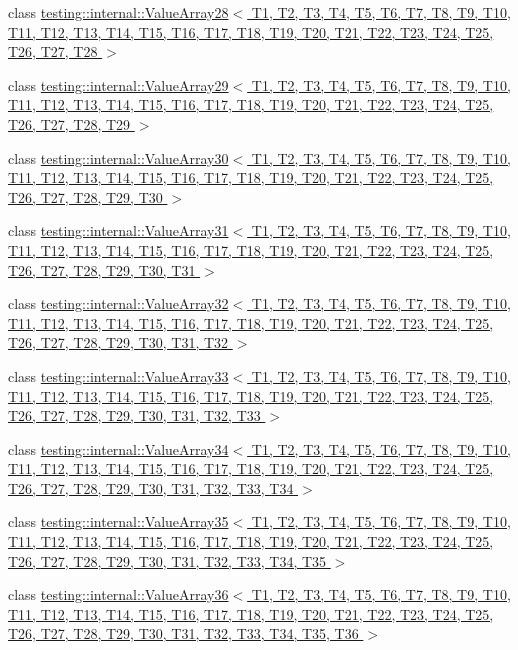 \begin{DoxyCompactItemize}
class \hyperlink{classtesting_1_1internal_1_1_value_array28}{testing\-::internal\-::\-Value\-Array28$<$ T1, T2, T3, T4, T5, T6, T7, T8, T9, T10, T11, T12, T13, T14, T15, T16, T17, T18, T19, T20, T21, T22, T23, T24, T25, T26, T27, T28 $>$}
\item 
class \hyperlink{classtesting_1_1internal_1_1_value_array29}{testing\-::internal\-::\-Value\-Array29$<$ T1, T2, T3, T4, T5, T6, T7, T8, T9, T10, T11, T12, T13, T14, T15, T16, T17, T18, T19, T20, T21, T22, T23, T24, T25, T26, T27, T28, T29 $>$}
\item 
class \hyperlink{classtesting_1_1internal_1_1_value_array30}{testing\-::internal\-::\-Value\-Array30$<$ T1, T2, T3, T4, T5, T6, T7, T8, T9, T10, T11, T12, T13, T14, T15, T16, T17, T18, T19, T20, T21, T22, T23, T24, T25, T26, T27, T28, T29, T30 $>$}
\item 
class \hyperlink{classtesting_1_1internal_1_1_value_array31}{testing\-::internal\-::\-Value\-Array31$<$ T1, T2, T3, T4, T5, T6, T7, T8, T9, T10, T11, T12, T13, T14, T15, T16, T17, T18, T19, T20, T21, T22, T23, T24, T25, T26, T27, T28, T29, T30, T31 $>$}
\item 
class \hyperlink{classtesting_1_1internal_1_1_value_array32}{testing\-::internal\-::\-Value\-Array32$<$ T1, T2, T3, T4, T5, T6, T7, T8, T9, T10, T11, T12, T13, T14, T15, T16, T17, T18, T19, T20, T21, T22, T23, T24, T25, T26, T27, T28, T29, T30, T31, T32 $>$}
\item 
class \hyperlink{classtesting_1_1internal_1_1_value_array33}{testing\-::internal\-::\-Value\-Array33$<$ T1, T2, T3, T4, T5, T6, T7, T8, T9, T10, T11, T12, T13, T14, T15, T16, T17, T18, T19, T20, T21, T22, T23, T24, T25, T26, T27, T28, T29, T30, T31, T32, T33 $>$}
\item 
class \hyperlink{classtesting_1_1internal_1_1_value_array34}{testing\-::internal\-::\-Value\-Array34$<$ T1, T2, T3, T4, T5, T6, T7, T8, T9, T10, T11, T12, T13, T14, T15, T16, T17, T18, T19, T20, T21, T22, T23, T24, T25, T26, T27, T28, T29, T30, T31, T32, T33, T34 $>$}
\item 
class \hyperlink{classtesting_1_1internal_1_1_value_array35}{testing\-::internal\-::\-Value\-Array35$<$ T1, T2, T3, T4, T5, T6, T7, T8, T9, T10, T11, T12, T13, T14, T15, T16, T17, T18, T19, T20, T21, T22, T23, T24, T25, T26, T27, T28, T29, T30, T31, T32, T33, T34, T35 $>$}
\item 
class \hyperlink{classtesting_1_1internal_1_1_value_array36}{testing\-::internal\-::\-Value\-Array36$<$ T1, T2, T3, T4, T5, T6, T7, T8, T9, T10, T11, T12, T13, T14, T15, T16, T17, T18, T19, T20, T21, T22, T23, T24, T25, T26, T27, T28, T29, T30, T31, T32, T33, T34, T35, T36 $>$}

\end{DoxyCompactItemize}
